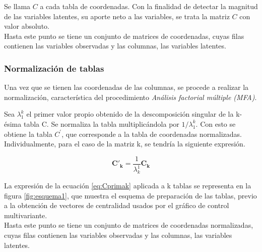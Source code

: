 \documentclass[mathematics,article,submit,moreauthors,pdftex]{mdpi}
\begin{document}
Se llama \(C\) a cada tabla de coordenadas. Con la finalidad de detectar
la magnitud de las variables latentes, su aporte neto a las variables,
se trata la matriz \(C\) con valor absoluto.\\
Hasta este punto se tiene un conjunto de matrices de coordenadas, cuyas
filas contienen las variables observadas y las columnas, las variables
latentes.

\hypertarget{normalizaciuxf3n-de-tablas}{%
\subsubsection{Normalización de
tablas}\label{normalizaciuxf3n-de-tablas}}

Una vez que se tienen las coordenadas de las columnas, se procede a
realizar la normalización, característica del procedimiento
\emph{Análisis factorial múltiple (MFA)}.

Sea \(\lambda_{1}^{k}\) el primer valor propio obtenido de la
descomposición singular de la k-ésima tabla C. Se normaliza la tabla
multiplicándola por \(1/\lambda_{1}^{k}\). Con esto se obtiene la tabla
\(C^{'}\), que corresponde a la tabla de coordenadas normalizadas.\\
Individualmente, para el caso de la matriz k, se tendría la siguiente
expresión.

\begin{equation}
\mathbf{C'_k}=\frac{1}{\lambda_{k}^1} \mathbf{C_k}
\label{eq:Cprimak}
\end{equation}

La expresión de la ecuación \ref{eq:Cprimak} aplicada a k tablas se
representa en la figura \ref{fig:esquema1}, que muestra el esquema de
preparación de las tablas, previo a la obtención de vectores de
centralidad usados por el gráfico de control multivariante.\\
Hasta este punto se tiene un conjunto de matrices de coordenadas
normalizadas, cuyas filas contienen las variables observadas y las
columnas, las variables latentes.
\end{document}
